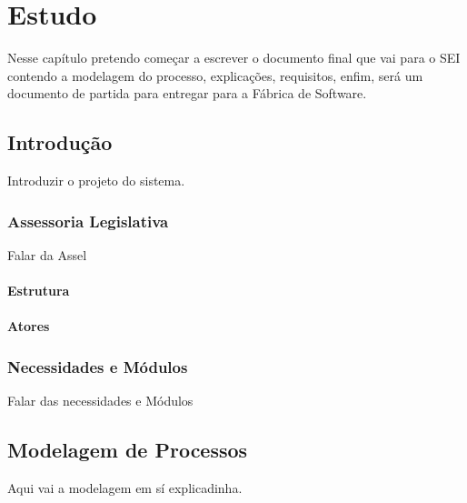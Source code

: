 \chapter{Estudo}

Nesse capítulo pretendo começar a escrever o documento final que vai para o SEI contendo a modelagem do processo, explicações, requisitos, enfim, será um documento de partida para entregar para a Fábrica de Software.


\section{Introdução}

Introduzir o projeto do sistema.

\subsection{Assessoria Legislativa}

Falar da Assel

\subsubsection{Estrutura}

\subsubsection{Atores}

\subsection{Necessidades e Módulos}

Falar das necessidades e Módulos


\section{Modelagem de Processos}

Aqui vai a modelagem em sí explicadinha.



